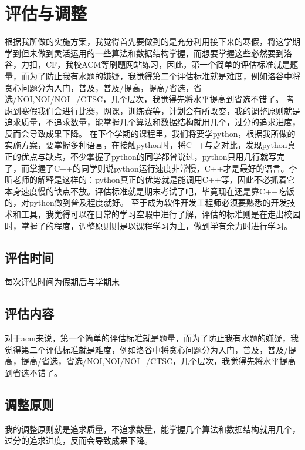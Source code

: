 \documentclass{article}
\begin{document}
	
	\section{评估与调整}
	根据我所做的实施方案，我觉得首先要做到的是充分利用接下来的寒假，将这学期学到但未做到灵活运用的一些算法和数据结构掌握，而想要掌握这些必然要到洛谷，力扣，CF，我校ACM等刷题网站练习，因此，第一个简单的评估标准就是题量，而为了防止我有水题的嫌疑，我觉得第二个评估标准就是难度，例如洛谷中将贪心问题分为入门，普及，普及/提高，提高/省选，省选/NOI,NOI/NOI+/CTSC，几个层次，我觉得先将水平提高到省选不错了。
	考虑到寒假我们会进行比赛，网课，训练赛等，计划会有所改变，我的调整原则就是追求质量，不追求数量，能掌握几个算法和数据结构就用几个，过分的追求进度，反而会导致成果下降。
	在下个学期的课程里，我们将要学python，根据我所做的实施方案，要掌握多种语言，在接触python时，将C++与之对比，发现python真正的优点与缺点，不少掌握了python的同学都曾说过，python只用几行就写完了，而掌握了C++的同学则说python运行速度非常慢，C++才是最好的语言。李昕老师的解释是这样的：python真正的优势就是能调用C++等，因此不必抓着它本身速度慢的缺点不放。评估标准就是期末考试了吧，毕竟现在还是靠C++吃饭的，对python做到普及程度就好。
	至于成为软件开发工程师必须要熟悉的开发技术和工具，我觉得可以在日常的学习空暇中进行了解，评估的标准则是在走出校园时，掌握了的程度，调整原则则是以课程学习为主，做到学有余力时进行学习。\par 
	\subsection{评估时间}
	每次评估时间为假期后与学期末\par
	\subsection{评估内容}
	对于acm来说，第一个简单的评估标准就是题量，而为了防止我有水题的嫌疑，我觉得第二个评估标准就是难度，例如洛谷中将贪心问题分为入门，普及，普及/提高，提高/省选，省选/NOI,NOI/NOI+/CTSC，几个层次，我觉得先将水平提高到省选不错了。\par
	\subsection{调整原则}
	我的调整原则就是追求质量，不追求数量，能掌握几个算法和数据结构就用几个，过分的追求进度，反而会导致成果下降。\par
	
	
	
	
\end{document}
